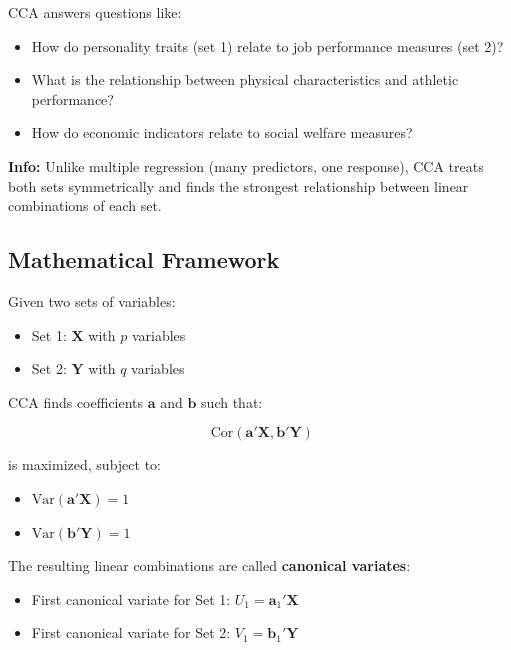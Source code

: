 \documentclass[
]{article}
\begin{document}
CCA answers questions like:

\begin{itemize}
\item
  How do personality traits (set 1) relate to job performance measures
  (set 2)?
\item
  What is the relationship between physical characteristics and athletic
  performance?
\item
  How do economic indicators relate to social welfare measures?
\end{itemize}

\textbf{Info: } Unlike multiple regression (many predictors, one
response), CCA treats both sets symmetrically and finds the strongest
relationship between linear combinations of each set.

\textbf{ }

\subsection{Mathematical Framework}

Given two sets of variables:

\begin{itemize}
\item
  Set 1: \(\mathbf{X}\) with \(p\) variables
\item
  Set 2: \(\mathbf{Y}\) with \(q\) variables
\end{itemize}

CCA finds coefficients \(\mathbf{a}\) and \(\mathbf{b}\) such that:

\[\text{ Cor}\left( \mathbf{a}'\mathbf{X},\mathbf{b}'\mathbf{Y} \right)\]

is maximized, subject to:

\begin{itemize}
\item
  \(\text{Var}\left( \mathbf{a}'\mathbf{X} \right) = 1\)
\item
  \(\text{Var}\left( \mathbf{b}'\mathbf{Y} \right) = 1\)
\end{itemize}

The resulting linear combinations are called \textbf{canonical
variates}:

\begin{itemize}
\item
  First canonical variate for Set 1:
  \(U_{1} = \mathbf{a}_{1}'\mathbf{X}\)
\item
  First canonical variate for Set 2:
  \(V_{1} = \mathbf{b}_{1}'\mathbf{Y}\)
\end{itemize}
\end{document}
